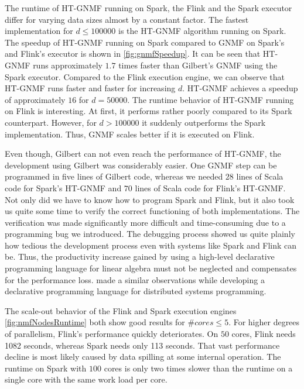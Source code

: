 The runtime of HT-GNMF running on Spark, the Flink and the Spark executor differ for varying data sizes almost by a constant factor.
The fastest implementation for $d\le 100000$ is the HT-GNMF algorithm running on Spark.
The speedup of HT-GNMF running on Spark compared to GNMF on Spark's and Flink's executor is shown in \cref{fig:gnmfSpeedup}.
It can be seen that HT-GNMF runs approximately $1.7$ times faster than Gilbert's GNMF using the Spark executor.
Compared to the Flink execution engine, we can observe that HT-GNMF runs faster and faster for increasing $d$.
HT-GNMF achieves a speedup of approximately $16$ for $d=50000$.
The runtime behavior of HT-GNMF running on Flink is interesting.
At first, it performs rather poorly compared to its Spark counterpart.
However, for $d>100000$ it suddenly outperforms the Spark implementation.
Thus, GNMF scales better if it is executed on Flink. 

Even though, Gilbert can not even reach the performance of HT-GNMF, the development using Gilbert was considerably easier.
One GNMF step can be programmed in five lines of Gilbert code, whereas we needed $28$ lines of Scala code for Spark's HT-GNMF and $70$ lines of Scala code for Flink's HT-GNMF.
Not only did we have to know how to program Spark and Flink, but it also took us quite some time to verify the correct functioning of both implementations.
The verification was made significantly more difficult and time-consuming due to a programming bug we introduced.
The debugging process showed us quite plainly how tedious the development process even with systems like Spark and Flink can be.
Thus, the productivity increase gained by using a high-level declarative programming language for linear algebra must not be neglected and compensates for the performance loss.
\cite{alvaro:2010a} made a similar observations while developing a declarative programming language for distributed systems programming.

The scale-out behavior of the Flink and Spark execution engines \cref{fig:nmfNodesRuntime} both show good results for $\#cores \le 5$.
For higher degrees of parallelism, Flink's performance quickly deteriorates.
On $50$ cores, Flink needs 1082 seconds, whereas Spark needs only 113 seconds.
That vast performance decline is most likely caused by data spilling at some internal operation.
The runtime on Spark with $100$ cores is only two times slower than the runtime on a single core with the same work load per core.



